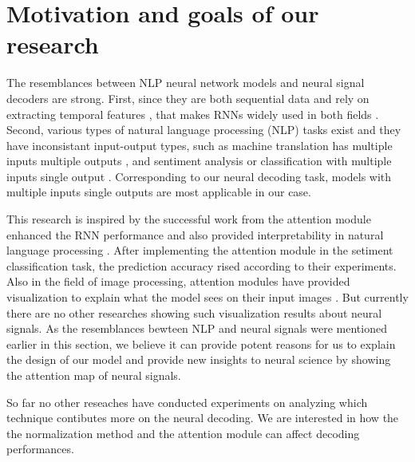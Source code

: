 \section{Motivation and goals of our research}
\label{sec:inspirations_and_goals}
The resemblances between NLP neural network models and neural signal decoders are strong.
First, since they are both sequential data and rely on extracting temporal features \citep{pustejovsky2005temporal, kornysheva2014human},
that makes RNNs widely used in both fields \citep{yin2017comparative, glaser2020machine, xu2019comparison}.
Second, various types of natural language processing (NLP) tasks exist and they have inconsistant input-output types,
such as machine translation has multiple inputs multiple outputs \citep{bahdanau2014neural, luong2015effective, vaswani2017attention},
and sentiment analysis or classification with multiple inputs single output \citep{cheng2016long, yang2016hierarchical, wang2016attention}.
Corresponding to our neural decoding task, models with multiple inputs single outputs are most applicable in our case.

This research is inspired by the successful work from the attention module enhanced the RNN performance and also provided interpretability in natural language processing \citep{lin2017structured}.
After implementing the attention module in the setiment classification task,
the prediction accuracy rised according to their experiments.
Also in the field of image processing,
attention modules have provided visualization to explain what the model sees on their input images \citep{hu2018squeeze, woo2018cbam}.
But currently there are no other researches showing such visualization results about neural signals.
As the resemblances bewteen NLP and neural signals were mentioned earlier in this section,
we believe it can provide potent reasons for us to explain the design of our model and provide new insights to neural science by showing the attention map of neural signals.

So far no other reseaches have conducted experiments on analyzing which technique contibutes more on the neural decoding. 
We are interested in how the the normalization method \citep{xu2019understanding} and the attention module \citep{lin2017structured} can affect decoding performances.

